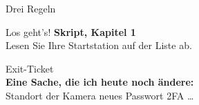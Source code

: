 \begin{frame}{Drei Regeln}
	\vspace{6mm}
	\centering
	\hfill
	\hfill
\end{frame}

\begin{frame}{Los geht's!}
	\centering
	{\Huge\bfseries Skript, Kapitel 1}\\[4mm]
	{\large Lesen Sie Ihre Startstation auf der Liste ab.}\\[10mm]
	{\color{FDUteal}\fontsize{60}{66}\selectfont\faUserSecret}
\end{frame}

{
\begin{frame}\end{frame}}

\begin{frame}{Exit-Ticket}
	\centering
	{\color{FDUgreen}\fontsize{60}{66}\selectfont\faFlagCheckered}\\[6mm]
	{\LARGE\bfseries Eine Sache, die ich heute noch ändere:}\\[4mm]
	{\large Standort der Kamera \textperiodcentered{} neues Passwort \textperiodcentered{} 2FA \textperiodcentered{} \dots}
\end{frame}
